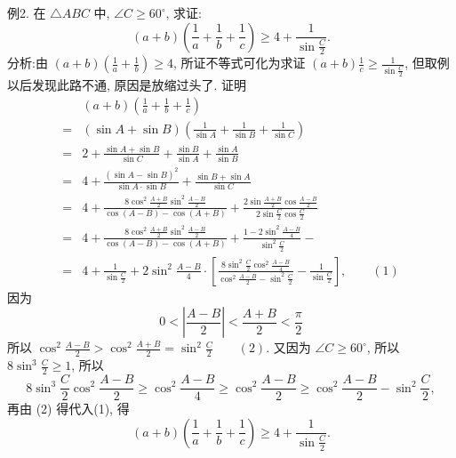 例2. 在 $\triangle A B C$ 中, $\angle C \geqslant 60^{\circ}$, 求证:
$$
(a+b)\left(\frac{1}{a}+\frac{1}{b}+\frac{1}{c}\right) \geqslant 4+\frac{1}{\sin \frac{C}{2}} .
$$
分析:由 $(a+b)\left(\frac{1}{a}+\frac{1}{b}\right) \geqslant 4$, 所证不等式可化为求证 $(a+b) \frac{1}{c} \geqslant \frac{1}{\sin \frac{C}{2}}$, 但取例以后发现此路不通, 原因是放缩过头了.
证明
$$
\begin{aligned}
& (a+b)\left(\frac{1}{a}+\frac{1}{b}+\frac{1}{c}\right) \\
= & (\sin A+\sin B)\left(\frac{1}{\sin A}+\frac{1}{\sin B}+\frac{1}{\sin C}\right) \\
= & 2+\frac{\sin A+\sin B}{\sin C}+\frac{\sin B}{\sin A}+\frac{\sin A}{\sin B} \\
= & 4+\frac{(\sin A-\sin B)^2}{\sin A \cdot \sin B}+\frac{\sin B+\sin A}{\sin C} \\
= & 4+\frac{8 \cos ^2 \frac{A+B}{2} \sin ^2 \frac{A-B}{2}}{\cos (A-B)-\cos (A+B)}+\frac{2 \sin \frac{A+B}{2} \cos \frac{A-B}{2}}{2 \sin \frac{C}{2} \cos \frac{C}{2}} \\
= & 4+\frac{8 \cos ^2 \frac{A+B}{2} \sin ^2 \frac{A-B}{2}}{\cos (A-B)-\cos (A+B)}+\frac{1-2 \sin ^2 \frac{A-B}{4}}{\sin ^2 \frac{C}{2}}- \\
= & 4+\frac{1}{\sin \frac{C}{2}}+2 \sin ^2 \frac{A-B}{4} \cdot\left[\frac{8 \sin ^2 \frac{C}{2} \cos ^2 \frac{A-B}{4}}{\cos ^2 \frac{A-B}{2}-\sin ^2 \frac{C}{2}}-\frac{1}{\sin \frac{C}{2}}\right], \quad\quad(1)
\end{aligned}
$$
因为
$$
0<\left|\frac{A-B}{2}\right|<\frac{A+B}{2}<\frac{\pi}{2}
$$
所以 $\cos ^2 \frac{A-B}{2}>\cos ^2 \frac{A+B}{2}=\sin ^2 \frac{C}{2} \quad\quad(2)$.
又因为 $\angle C \geqslant 60^{\circ}$, 所以 $8 \sin ^3 \frac{C}{2} \geqslant 1$, 所以
$$
8 \sin ^3 \frac{C}{2} \cos ^2 \frac{A-B}{2} \geqslant \cos ^2 \frac{A-B}{4} \geqslant \cos ^2 \frac{A-B}{2} \geqslant \cos ^2 \frac{A-B}{2}-\sin ^2 \frac{C}{2},
$$
再由 (2) 得代入(1), 得
$$
(a+b)\left(\frac{1}{a}+\frac{1}{b}+\frac{1}{c}\right) \geqslant 4+\frac{1}{\sin \frac{C}{2}} .
$$



